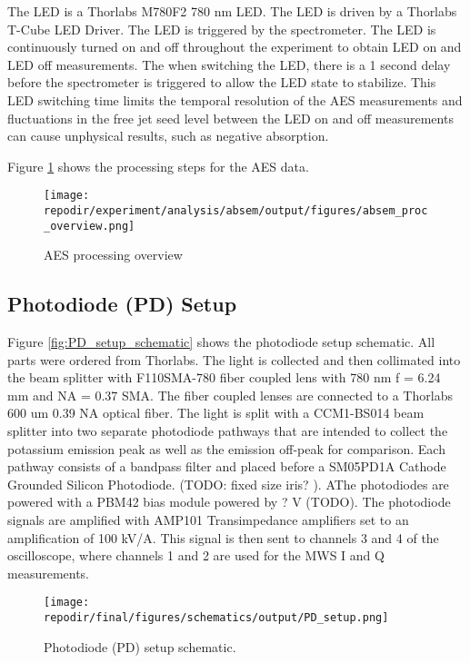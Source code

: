 The LED is a Thorlabs M780F2 780 nm LED. The LED is driven by a Thorlabs T-Cube LED Driver. The LED is triggered by the spectrometer. The LED is continuously turned on and off throughout the experiment to obtain LED on and LED off measurements. The when switching the LED, there is a 1 second delay before the spectrometer is triggered to allow the LED state to stabilize. This LED switching time limits the temporal resolution of the AES measurements and fluctuations in the free jet seed level between the LED on and off measurements can cause unphysical results, such as negative absorption. 




Figure \ref{fig:SI_AES_proc_overview} shows the processing steps for the AES data.

\begin{figure}[]
    \centering
    \texttt{[image: \\repodir/experiment/analysis/absem/output/figures/absem\_proc\_overview.png]}
    \caption{AES processing overview}
    \label{fig:SI_AES_proc_overview}
\end{figure}


\subsection{Photodiode (PD) Setup}

Figure \ref{fig:PD_setup_schematic} shows the photodiode setup schematic. All parts were ordered from Thorlabs. The light is collected and then collimated into the beam splitter with F110SMA-780 fiber coupled lens with 780 nm f = 6.24 mm and NA = 0.37 SMA. The fiber coupled lenses are connected to a Thorlabs 600 um 0.39 NA optical fiber. The light is split with a CCM1-BS014 beam splitter into two separate photodiode pathways that are intended to collect the potassium emission peak as well as the emission off-peak for comparison. Each pathway consists of a bandpass filter and placed before a SM05PD1A Cathode Grounded Silicon Photodiode. (TODO: fixed size iris? ). AThe photodiodes are powered with a PBM42 bias module powered by ? V (TODO). The photodiode signals are amplified with AMP101 Transimpedance amplifiers set to an amplification of 100 kV/A. This signal is then sent to channels 3 and 4 of the oscilloscope, where channels 1 and 2 are used for the MWS  I and Q measurements.



\begin{figure}[]
    \centering
    \texttt{[image: \\repodir/final/figures/schematics/output/PD\_setup.png]}
    \caption{Photodiode (PD) setup schematic.}
    \label{fig:SI_PD_setup_schematic}
\end{figure}



